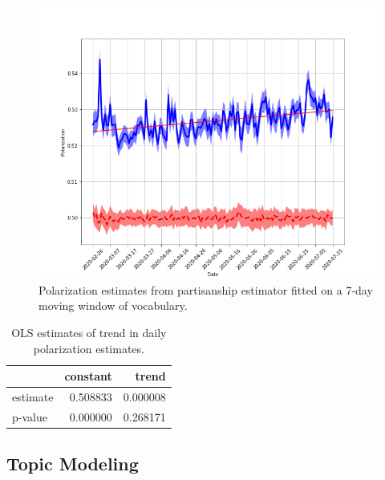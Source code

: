 \documentclass{article}
\begin{document}
	\begin{figure}[!h]
		\centering
		\includegraphics[width=\columnwidth]{figures/polarization_moving_window.png}
		\caption{Polarization estimates from partisanship estimator fitted on a 7-day moving window of vocabulary.}
		\label{fig:polarization_moving_window}
	\end{figure}

	\begin{table}
		\centering
		\begin{tabular}{lrr}
			\toprule
			{} &  constant &     trend \\
			\midrule
			estimate &  0.508833 &  0.000008 \\
			p-value  &  0.000000 &  0.268171 \\
			\bottomrule
		\end{tabular}
	\caption{OLS estimates of trend in daily polarization estimates.}
	\label{tab:polarization_overall_ols}
		
	\end{table}





	\FloatBarrier
	
	\subsection{Topic Modeling}
	
\end{document}
